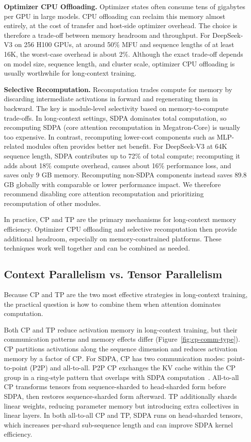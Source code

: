 \textbf{Optimizer CPU Offloading.}
Optimizer states often consume tens of gigabytes per GPU in large models. CPU offloading can reclaim this memory almost entirely, at the cost of transfer and host-side optimizer overhead. The choice is therefore a trade-off between memory headroom and throughput. For DeepSeek-V3 on 256 H100 GPUs, at around 50\% MFU and sequence lengths of at least 16K, the worst-case overhead is about 2\%. Although the exact trade-off depends on model size, sequence length, and cluster scale, optimizer CPU offloading is usually worthwhile for long-context training.

\textbf{Selective Recomputation.}
Recomputation trades compute for memory by discarding intermediate activations in forward and regenerating them in backward. The key is module-level selectivity based on memory-to-compute trade-offs. In long-context settings, SDPA dominates total computation, so recomputing SDPA (core attention recomputation in Megatron-Core) is usually too expensive. In contrast, recomputing lower-cost components such as MLP-related modules often provides better net benefit. For DeepSeek-V3 at 64K sequence length, SDPA contributes up to 72\% of total compute; recomputing it adds about 18\% compute overhead, causes about 16\% performance loss, and saves only 9 GB memory. Recomputing non-SDPA components instead saves 89.8 GB globally with comparable or lower performance impact. We therefore recommend disabling core attention recomputation and prioritizing recomputation of other modules.

In practice, CP and TP are the primary mechanisms for long-context memory efficiency. Optimizer CPU offloading and selective recomputation then provide additional headroom, especially on memory-constrained platforms. These techniques work well together and can be combined as needed.

\subsection{Context Parallelism vs. Tensor Parallelism}

Because CP and TP are the two most effective strategies in long-context training, the practical question is how to combine them when attention dominates computation.

Both CP and TP reduce activation memory in long-context training, but their communication patterns and memory effects differ (Figure~\ref{fig:cp-comm-type}). CP partitions activations along the sequence dimension and reduces activation memory by a factor of $\text{CP}$. For SDPA, CP has two communication modes: point-to-point (P2P) and all-to-all. P2P CP exchanges the KV cache within the CP group in a ring-style pattern that overlaps with SDPA computation~\cite{liu2023ringattention,brandon2023striped,jacobs2023deepspeedulysses}. All-to-all CP transforms tensors from sequence-sharded to head-sharded form before SDPA, then restores sequence-sharded form afterward. TP additionally shards linear weights, reducing parameter memory but introducing extra collectives in linear layers. In both all-to-all CP and TP, SDPA runs on head-sharded tensors, which increases per-shard sub-sequence length and can improve SDPA kernel efficiency.

